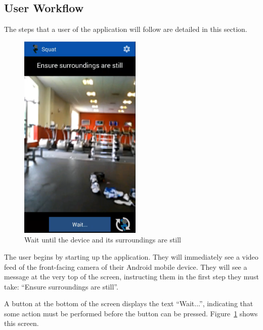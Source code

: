 \subsection{User Workflow}

The steps that a user of the application will follow are detailed in this section.

\begin{figure}[H]
    \centering
	\includegraphics[height=10cm]{application/images/ensuresurroundingsstill}
\caption{Wait until the device and its surroundings are still}
\label{fig:ensuresurroundings}
\end{figure}

The user begins by starting up the application. They will immediately see a video feed of the front-facing camera of their Android mobile device. They will see a message at the very top of the screen, instructing them in the first step they must take: ``Ensure surroundings are still''.

A button at the bottom of the screen displays the text ``Wait...'', indicating that some action must be performed before the button can be pressed. Figure~\ref{fig:ensuresurroundings} shows this screen.

